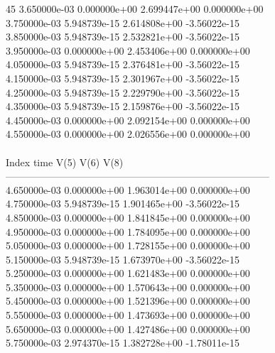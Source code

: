 45	3.650000e-03	0.000000e+00	2.699447e+00	0.000000e+00	\\ 	3.750000e-03	5.948739e-15	2.614808e+00	-3.56022e-15	\\ 	3.850000e-03	5.948739e-15	2.532821e+00	-3.56022e-15	\\ 	3.950000e-03	0.000000e+00	2.453406e+00	0.000000e+00	\\ 	4.050000e-03	5.948739e-15	2.376481e+00	-3.56022e-15	\\ 	4.150000e-03	5.948739e-15	2.301967e+00	-3.56022e-15	\\ 	4.250000e-03	5.948739e-15	2.229790e+00	-3.56022e-15	\\ 	4.350000e-03	5.948739e-15	2.159876e+00	-3.56022e-15	\\ 	4.450000e-03	0.000000e+00	2.092154e+00	0.000000e+00	\\ 	4.550000e-03	0.000000e+00	2.026556e+00	0.000000e+00	\\ \hline
\\ \hline
Index   time            V(5)            V(6)            V(8)            \\ \hline
--------------------------------------------------------------------------------\\ 	4.650000e-03	0.000000e+00	1.963014e+00	0.000000e+00	\\ 	4.750000e-03	5.948739e-15	1.901465e+00	-3.56022e-15	\\ 	4.850000e-03	0.000000e+00	1.841845e+00	0.000000e+00	\\ 	4.950000e-03	0.000000e+00	1.784095e+00	0.000000e+00	\\ 	5.050000e-03	0.000000e+00	1.728155e+00	0.000000e+00	\\ 	5.150000e-03	5.948739e-15	1.673970e+00	-3.56022e-15	\\ 	5.250000e-03	0.000000e+00	1.621483e+00	0.000000e+00	\\ 	5.350000e-03	0.000000e+00	1.570643e+00	0.000000e+00	\\ 	5.450000e-03	0.000000e+00	1.521396e+00	0.000000e+00	\\ 	5.550000e-03	0.000000e+00	1.473693e+00	0.000000e+00	\\ 	5.650000e-03	0.000000e+00	1.427486e+00	0.000000e+00	\\ 	5.750000e-03	2.974370e-15	1.382728e+00	-1.78011e-15	\\ \hline
